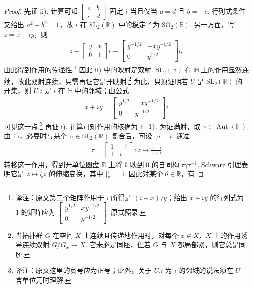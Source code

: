 \begin{proof}
先证 ii). 计算可知 $\begin{bmatrix}a&b\\c&d\end{bmatrix}$ 固定 $i$ 当且仅当 $a=d$ 且 $b=-c$. 行列式条件又给出 $a^2+b^2=1$，故 $i$ 在 $\mathrm{SL}_2(\mathbb R)$ 中的稳定子为 $\mathrm{SO}_2(\mathbb R)$. 另一方面，写 $z=x+iy$，则
\begin{align*}
z=\begin{bmatrix}y&x\\0&1\end{bmatrix}i=\begin{bmatrix}y^{-1/2}&-xy^{-1/2}\\0&y^{1/2}\end{bmatrix}i,
\end{align*}
由此得到作用的传递性.\footnote{译注：原文第二个矩阵作用于 $i$ 所得是 $(i-x)/y$；给出 $x+iy$ 的行列式为 $1$ 的矩阵应为 $\left[\begin{smallmatrix}y^{1/2}&xy^{-1/2}\\0&y^{-1/2}\end{smallmatrix}\right]$. 原式照录.}
因此 ii) 中的映射是双射. $\mathrm{SL}_2(\mathbb R)$ 在 $\mathbb H$ 上的作用显然连续，故此双射连续，只需再证它是开映射.\footnote{当拓扑群 $G$ 在空间 $X$ 上连续且传递地作用时，对每个 $x\in X$，$X$ 上的作用诱导连续双射 $G/G_x\to X$. 它未必是同胚，但若 $G$ 与 $X$ 都局部紧，则它总是同胚.}
为此，只须证明若 $U$ 是 $\mathrm{SL}_2(\mathbb R)$ 的开集，则 $U.i$ 是 $i$ 在 $\mathbb H$ 中的邻域；由公式
\begin{align*}
x+iy=\begin{bmatrix}y^{1/2}&-xy^{-1/2}\\0&y^{-1/2}\end{bmatrix}i
\end{align*}
可见这一点.\footnote{译注：原文这里的负号应为正号；此外，关于 $U.i$ 为 $i$ 的邻域的说法须在 $U$ 含单位元时理解.}
再证 i). 计算可知作用的核确为 $\{\pm1\}$. 为证满射，取 $\gamma\in\operatorname{Aut}(\mathbb H)$. 由 ii)，必要时与某个 $\alpha\in\mathrm{SL}_2(\mathbb R)$ 复合后，可设 $\gamma i=i$. 通过
\begin{align*}
\tau=\begin{bmatrix}1&-i\\1&i\end{bmatrix}:z\longmapsto\frac{z-i}{z+i}
\end{align*}
转移这一作用，得到开单位圆盘 $\mathbb D$ 上将 $0$ 映到 $0$ 的自同构 $\tau\gamma\tau^{-1}$. Schwarz 引理表明它是 $z\mapsto\zeta z$ 的伸缩变换，其中 $|\zeta|=1$. 因此对某个 $\theta\in\mathbb R$，有

\end{proof}
